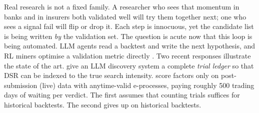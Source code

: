 \documentclass[11pt]{article}
\theoremstyle{definition}
\theoremstyle{remark}
\begin{document}
Real research is not a fixed family. A researcher who sees that momentum in banks and in insurers both validated well will try them together next; one who sees a signal fail will flip or drop it. Each step is innocuous, yet the candidate list is being written \emph{by} the validation set. The question is acute now that this loop is being automated. LLM agents read a backtest and write the next hypothesis, and RL miners optimise a validation metric directly \citep{yu2023alphagen,shi2025alphaforge}. Two recent responses illustrate the state of the art. \citet{gencay2026honest} give an LLM discovery system a complete \emph{trial ledger} so that DSR can be indexed to the true search intensity. \citet{qu2026propose} score factors only on post-submission (live) data with anytime-valid e-processes, paying roughly 500 trading days of waiting per verdict. The first assumes that counting trials suffices for historical backtests. The second gives up on historical backtests.
\end{document}
